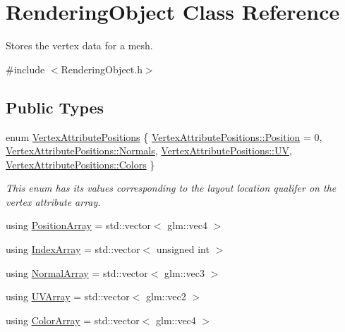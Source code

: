 \hypertarget{class_rendering_object}{}\section{Rendering\+Object Class Reference}
\label{class_rendering_object}


Stores the vertex data for a mesh.  




{\ttfamily \#include $<$Rendering\+Object.\+h$>$}

\subsection*{Public Types}
\begin{DoxyCompactItemize}
\item 
enum \hyperlink{class_rendering_object_ab772f569ef63a1db07db29a744b519ee}{Vertex\+Attribute\+Positions} \{ \hyperlink{class_rendering_object_ab772f569ef63a1db07db29a744b519eea52f5e0bc3859bc5f5e25130b6c7e8881}{Vertex\+Attribute\+Positions\+::\+Position} = 0, 
\hyperlink{class_rendering_object_ab772f569ef63a1db07db29a744b519eea4ab971a51f0335cbf8d9c2c65d379e99}{Vertex\+Attribute\+Positions\+::\+Normals}, 
\hyperlink{class_rendering_object_ab772f569ef63a1db07db29a744b519eeadeaa2adbeb26802ae61609c3f3642d82}{Vertex\+Attribute\+Positions\+::\+U\+V}, 
\hyperlink{class_rendering_object_ab772f569ef63a1db07db29a744b519eea5d50889672f6f860d14f502de3de1957}{Vertex\+Attribute\+Positions\+::\+Colors}
 \}
\begin{DoxyCompactList}\small\item\em This enum has its values corresponding to the layout location qualifer on the vertex attribute array. \end{DoxyCompactList}\item 
using \hyperlink{class_rendering_object_a1223b9cf03f2029b9c43d71042c2a18e}{Position\+Array} = std\+::vector$<$ glm\+::vec4 $>$
\item 
using \hyperlink{class_rendering_object_a9931c88bca3384065c6691dfe1e60af1}{Index\+Array} = std\+::vector$<$ unsigned int $>$
\item 
using \hyperlink{class_rendering_object_a327c4d892de8d6138fb59afa6d078257}{Normal\+Array} = std\+::vector$<$ glm\+::vec3 $>$
\item 
using \hyperlink{class_rendering_object_a504ecd45ebe36dfa5b78c46d64d9904a}{U\+V\+Array} = std\+::vector$<$ glm\+::vec2 $>$
\item 
using \hyperlink{class_rendering_object_a8a12e1f9be788d99af6c089e1c600022}{Color\+Array} = std\+::vector$<$ glm\+::vec4 $>$
\end{DoxyCompactItemize}
